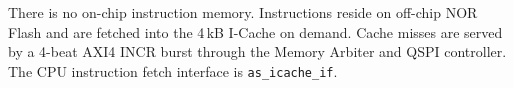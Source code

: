 There is no on-chip instruction memory.
Instructions reside on off-chip NOR Flash and are fetched into the
4\,kB I-Cache on demand.
Cache misses are served by a 4-beat AXI4 INCR burst through the Memory
Arbiter and QSPI controller.
The CPU instruction fetch interface is \texttt{as\_icache\_if}.
